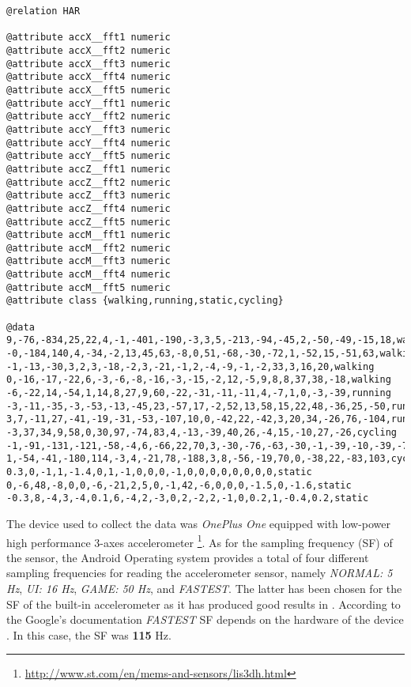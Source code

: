    
    
\begin{lstlisting}[caption=WEKA ARFF file extract,
label=weka-arff-code,captionpos=b, frame=single,basicstyle=\small,float,floatplacement=H,breaklines=true]
@relation HAR
    
@attribute accX__fft1 numeric
@attribute accX__fft2 numeric
@attribute accX__fft3 numeric
@attribute accX__fft4 numeric
@attribute accX__fft5 numeric
@attribute accY__fft1 numeric
@attribute accY__fft2 numeric
@attribute accY__fft3 numeric
@attribute accY__fft4 numeric
@attribute accY__fft5 numeric
@attribute accZ__fft1 numeric
@attribute accZ__fft2 numeric
@attribute accZ__fft3 numeric
@attribute accZ__fft4 numeric
@attribute accZ__fft5 numeric
@attribute accM__fft1 numeric
@attribute accM__fft2 numeric
@attribute accM__fft3 numeric
@attribute accM__fft4 numeric
@attribute accM__fft5 numeric
@attribute class {walking,running,static,cycling}
    
@data
9,-76,-834,25,22,4,-1,-401,-190,-3,3,5,-213,-94,-45,2,-50,-49,-15,18,walking
-0,-184,140,4,-34,-2,13,45,63,-8,0,51,-68,-30,-72,1,-52,15,-51,63,walking
-1,-13,-30,3,2,3,-18,-2,3,-21,-1,2,-4,-9,-1,-2,33,3,16,20,walking
0,-16,-17,-22,6,-3,-6,-8,-16,-3,-15,-2,12,-5,9,8,8,37,38,-18,walking
-6,-22,14,-54,1,14,8,27,9,60,-22,-31,-11,-11,4,-7,1,0,-3,-39,running
-3,-11,-35,-3,-53,-13,-45,23,-57,17,-2,52,13,58,15,22,48,-36,25,-50,running
3,7,-11,27,-41,-19,-31,-53,-107,10,0,-42,22,-42,3,20,34,-26,76,-104,running
-3,37,34,9,58,0,30,97,-74,83,4,-13,-39,40,26,-4,15,-10,27,-26,cycling
-1,-91,-131,-121,-58,-4,6,-66,22,70,3,-30,-76,-63,-30,-1,-39,-10,-39,-76,cycling
1,-54,-41,-180,114,-3,4,-21,78,-188,3,8,-56,-19,70,0,-38,22,-83,103,cycling
0.3,0,-1,1,-1.4,0,1,-1,0,0,0,-1,0,0,0,0,0,0,0,0,static
0,-6,48,-8,0,0,-6,-21,2,5,0,-1,42,-6,0,0,0,-1.5,0,-1.6,static
-0.3,8,-4,3,-4,0.1,6,-4,2,-3,0,2,-2,2,-1,0,0.2,1,-0.4,0.2,static
\end{lstlisting}
    
    The device used to collect the data was \textit{OnePlus One} equipped with low-power high performance 3-axes accelerometer \footnote{\url{http://www.st.com/en/mems-and-sensors/lis3dh.html}}. As for the sampling frequency (SF) of the sensor, the Android Operating system provides a total of four different sampling frequencies for reading the accelerometer sensor, namely \textit{NORMAL: 5 Hz}, \textit{UI: 16 Hz}, \textit{GAME: 50 Hz}, and \textit{FASTEST}. The latter has been chosen for the SF of the built-in accelerometer as it has produced good results in \citet[3-5]{lee2016}. According to the Google's documentation \textit{FASTEST} SF depends on the hardware of the device \citep{googlesensormanager2017}. In this case, the SF was \textbf{115} Hz. 
    
